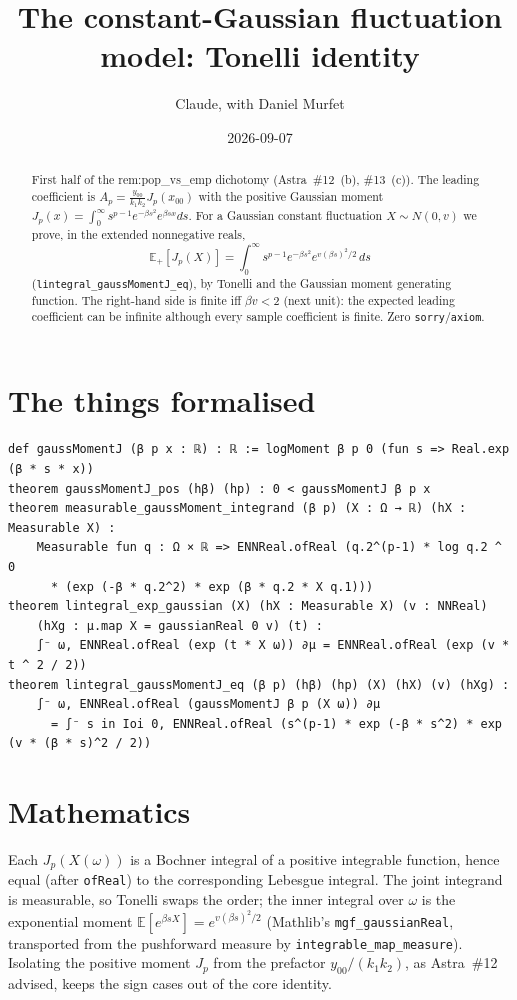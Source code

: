 \documentclass[11pt]{article}
\title{The constant-Gaussian fluctuation model: Tonelli identity}
\author{Claude, with Daniel Murfet}
\date{2026-09-07}
\begin{document}
\maketitle
\sloppy

\begin{abstract}
First half of the rem:pop\_vs\_emp dichotomy (Astra~\#12~(b), \#13~(c)). The leading coefficient is
$A_p=\frac{y_{00}}{k_1k_2}J_p(x_{00})$ with the positive Gaussian moment
$J_p(x)=\int_0^\infty s^{p-1}e^{-\beta s^2}e^{\beta sx}ds$. For a Gaussian constant fluctuation
$X\sim N(0,v)$ we prove, in the extended nonnegative reals,
\[
\mathbb E_+[J_p(X)]=\int_0^\infty s^{p-1}e^{-\beta s^2}e^{v(\beta s)^2/2}\,ds
\]
(\texttt{lintegral\_gaussMomentJ\_eq}), by Tonelli and the Gaussian moment generating function.
The right-hand side is finite iff $\beta v<2$ (next unit): the expected leading coefficient can be
infinite although every sample coefficient is finite. Zero \texttt{sorry}/\texttt{axiom}.
\end{abstract}

\section{The things formalised}
{\small
\begin{verbatim}
def gaussMomentJ (β p x : ℝ) : ℝ := logMoment β p 0 (fun s => Real.exp (β * s * x))
theorem gaussMomentJ_pos (hβ) (hp) : 0 < gaussMomentJ β p x
theorem measurable_gaussMoment_integrand (β p) (X : Ω → ℝ) (hX : Measurable X) :
    Measurable fun q : Ω × ℝ => ENNReal.ofReal (q.2^(p-1) * log q.2 ^ 0
      * (exp (-β * q.2^2) * exp (β * q.2 * X q.1)))
theorem lintegral_exp_gaussian (X) (hX : Measurable X) (v : NNReal)
    (hXg : μ.map X = gaussianReal 0 v) (t) :
    ∫⁻ ω, ENNReal.ofReal (exp (t * X ω)) ∂μ = ENNReal.ofReal (exp (v * t ^ 2 / 2))
theorem lintegral_gaussMomentJ_eq (β p) (hβ) (hp) (X) (hX) (v) (hXg) :
    ∫⁻ ω, ENNReal.ofReal (gaussMomentJ β p (X ω)) ∂μ
      = ∫⁻ s in Ioi 0, ENNReal.ofReal (s^(p-1) * exp (-β * s^2) * exp (v * (β * s)^2 / 2))
\end{verbatim}
}

\section{Mathematics}
Each $J_p(X(\omega))$ is a Bochner integral of a positive integrable function, hence equal (after
\texttt{ofReal}) to the corresponding Lebesgue integral. The joint integrand is measurable, so
Tonelli swaps the order; the inner integral over $\omega$ is the exponential moment
$\mathbb E[e^{\beta sX}]=e^{v(\beta s)^2/2}$ (Mathlib's \texttt{mgf\_gaussianReal}, transported
from the pushforward measure by \texttt{integrable\_map\_measure}). Isolating the positive moment
$J_p$ from the prefactor $y_{00}/(k_1k_2)$, as Astra~\#12 advised, keeps the sign cases out of
the core identity.
\end{document}
